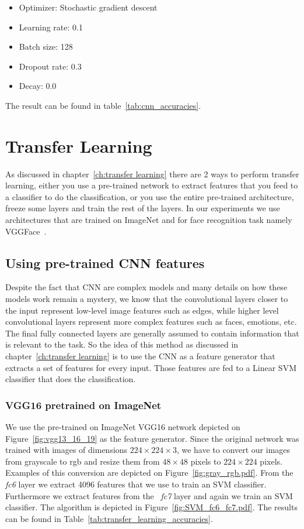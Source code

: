 \begin{itemize}
  \item Optimizer: Stochastic gradient descent
  \item Learning rate: 0.1
  \item Batch size: 128
  \item Dropout rate: 0.3
  \item Decay: 0.0
\end{itemize}

The result can be found in table~\ref{tab:cnn_accuracies}.

\section{Transfer Learning}
As discussed in chapter~\ref{ch:transfer learning} there are 2 ways to perform transfer learning, either you use a pre-trained network to extract features that you feed to a classifier to do the classification, or you use the entire pre-trained architecture, freeze some layers and train the rest of the layers. In our experiments we use architectures that are trained on ImageNet and for face recognition task namely VGGFace~\cite{Parkhi15}. 

\subsection{Using pre-trained CNN features}
Despite the fact that CNN are complex models and many details on how these models work remain a mystery, we know that the convolutional layers closer to the input represent low-level image features such as edges, while higher level convolutional layers represent more complex features such as faces, emotions, etc. The final fully connected layers are generally assumed to contain information that is relevant to the task. So the idea of this method as discussed in chapter~\ref{ch:transfer learning} is to use the CNN as a feature generator that extracts a set of features for every input. Those features are fed to a Linear SVM classifier that does the classification.

\subsubsection{VGG16 pretrained on ImageNet}
We use the pre-trained on ImageNet VGG16 network depicted on Figure~\ref{fig:vgg13_16_19} as the feature generator. Since the original network was trained with images of dimensions $224\times 224 \times 3$, we have to convert our images from grayscale to rgb and resize them from $48\times 48$ pixels to $224\times 224$ pixels. Examples of this conversion are depicted on Figure~\ref{fig:gray_rgb.pdf}. From the \textit{fc6} layer we extract 4096 features that we use to train an SVM classifier. Furthermore we extract features from the ~\textit{fc7} layer and again we train an SVM classifier. The algorithm is depicted in Figure~\ref{fig:SVM_fc6_fc7.pdf}. The results can be found in Table~\ref{tab:transfer_learning_accuracies}.

